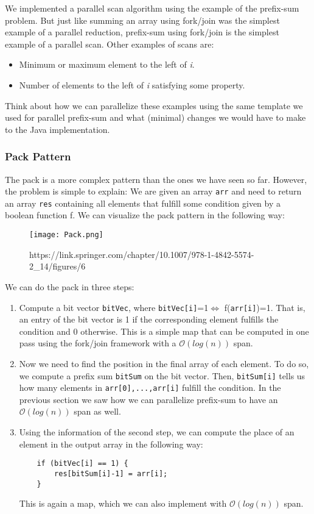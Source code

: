 \documentclass[main.tex]{subfiles}
\begin{document}
We implemented a parallel scan algorithm using the example of the prefix-sum problem. But just like summing an array using fork/join was the simplest example of a parallel reduction, prefix-sum using fork/join is the simplest example of a parallel scan. Other examples of scans are:

\begin{itemize}
  \item Minimum or maximum element to the left of \textit{i}.
  \item Number of elements to the left of \textit{i} satisfying some property.
\end{itemize}

\noindent Think about how we can parallelize these examples using the same template we used for parallel prefix-sum and what (minimal) changes we would have to make to the Java implementation.

\subsubsection{Pack Pattern}
The pack is a more complex pattern than the ones we have seen so far. However, the problem is simple to explain: We are given an array \texttt{arr} and need to return an array \texttt{res} containing all elements that fulfill some condition given by a boolean function f. We can visualize the pack pattern in the following way:

\begin{figure}[H]
    \centering
    \texttt{[image: Pack.png]}
    \caption{https://link.springer.com/chapter/10.1007/978-1-4842-5574-2\_14/figures/6}
\end{figure}

\noindent We can do the pack in three steps:

\begin{enumerate}
  \item Compute a bit vector \texttt{bitVec}, where \texttt{bitVec[i]}=1\(\iff\) f(\texttt{arr[i]})=1. That is, an entry of the bit vector is 1 if the corresponding element fulfills the condition and 0 otherwise. This is a simple map that can be computed in one pass using the fork/join framework with a \(\mathcal{O}(log(n))\) span.
  \item Now we need to find the position in the final array of each element. To do so, we compute a prefix sum \texttt{bitSum} on the bit vector. Then, \texttt{bitSum[i]} tells us how many elements in \texttt{arr[0],...,arr[i]} fulfill the condition. In the previous section we saw how we can parallelize prefix-sum to have an \(\mathcal{O}(log(n))\) span as well.
  \item Using the information of the second step, we can compute the place of an element in the output array in the following way:
    \begin{verbatim}
    if (bitVec[i] == 1) {
        res[bitSum[i]-1] = arr[i];
    }
    \end{verbatim}
    This is again a map, which we can also implement with \(\mathcal{O}(log(n))\) span.
\end{enumerate}
\end{document}
